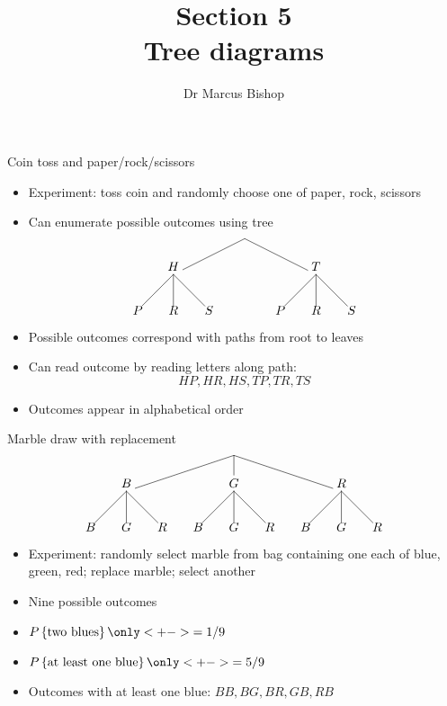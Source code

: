 \documentclass{beamer}
\title[\S5]{Section 5\\Tree diagrams}
\author{Dr Marcus Bishop}
\theoremstyle{definition}
\begin{document}
\begin{frame}\titlepage\end{frame}
\LogoOff

\begin{frame}{Coin toss and paper/rock/scissors}
\begin{itemize}
\item Experiment: toss coin \alert{and} randomly choose
one of paper, rock, scissors
\item Can enumerate possible outcomes using tree
\[\begin{xy}<1cm,0cm>:
(0,0)="0";
(-2,-1)="-21";
(2,-1)="21";
"0";"-21"*+!D{H}**\dir{-};
"0";"21"*+!D{T}**\dir{-};
"-21";(-3,-2)*{P}**\dir{-};
"-21";(-2,-2)*{R}**\dir{-};
"-21";(-1,-2)*{S}**\dir{-};
"21";(1,-2)*{P}**\dir{-};
"21";(2,-2)*{R}**\dir{-};
"21";(3,-2)*{S}**\dir{-};
\end{xy}\]
\item Possible outcomes correspond with paths from root to leaves
\item Can read outcome by reading letters along path:
\[HP,HR,HS,TP,TR,TS\]
\item Outcomes appear in alphabetical order
\end{itemize}
\end{frame}

\begin{frame}{Marble draw with replacement}
\[\begin{xy}<1cm,0cm>:
(0,0)="0";
(-3,-1)="-31";
(0,-1)="01";
(3,-1)="31";
"0";"-31"*+!D{B}**\dir{-};
"0";"01"*+!D{G}**\dir{-};
"0";"31"*+!D{R}**\dir{-};
"-31";(-4,-2)*{B}**\dir{-};
"-31";(-3,-2)*{G}**\dir{-};
"-31";(-2,-2)*{R}**\dir{-};
"01";(-1,-2)*{B}**\dir{-};
"01";(0,-2)*{G}**\dir{-};
"01";(1,-2)*{R}**\dir{-};
"31";(2,-2)*{B}**\dir{-};
"31";(3,-2)*{G}**\dir{-};
"31";(4,-2)*{R}**\dir{-};
\end{xy}\]
\begin{itemize}
\item Experiment: randomly select marble from bag
containing one each of blue, green, red;
\alert{replace marble}; select another
\item Nine possible outcomes
\item $P\left\{\text{two blues}\right\}
\only<+->{=1/9}$
\item $P\left\{\text{at least one blue}\right\}
\only<+->{=5/9}$
\item Outcomes with at least one blue:
$BB,BG,BR,GB,RB$
\end{itemize}
\end{frame}
\end{document}
